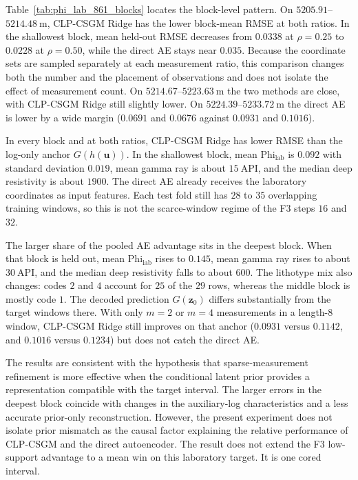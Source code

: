 \begin{table}[htbp]
  \centering
  \caption{Well 861 held-out laboratory-porosity RMSE by depth block. Each
  entry is the mean across the three seeds. Prior-only is $G(h(\boldsymbol{u}))$
  with no measurement term.}
  \label{tab:phi_lab_861_blocks}
  \small
\end{table}

Table~\ref{tab:phi_lab_861_blocks} locates the block-level pattern. On
$5205.91$--$5214.48~\mathrm{m}$, CLP-CSGM Ridge has the lower block-mean RMSE
at both ratios. In the shallowest block, mean held-out RMSE decreases from
$0.0338$ at $\rho=0.25$ to $0.0228$ at $\rho=0.50$, while the direct AE stays
near $0.035$. Because the coordinate sets are sampled separately at each
measurement ratio, this comparison changes both the number and the placement
of observations and does not isolate the effect of measurement count. On
$5214.67$--$5223.63~\mathrm{m}$ the two methods are close, with CLP-CSGM Ridge
still slightly lower. On $5224.39$--$5233.72~\mathrm{m}$ the direct AE is lower
by a wide margin ($0.0691$ and $0.0676$ against $0.0931$ and $0.1016$).

In every block and at both ratios, CLP-CSGM Ridge has lower RMSE than the
log-only anchor $G(h(\boldsymbol{u}))$. In the shallowest block, mean
$\mathrm{Phi_{lab}}$ is $0.092$ with standard deviation $0.019$, mean gamma ray
is about $15~\mathrm{API}$, and the median deep resistivity is about $1900$.
The direct AE already receives the laboratory coordinates as input features.
Each test fold still has $28$ to $35$ overlapping training windows, so this is
not the scarce-window regime of the F3 steps $16$ and $32$.

The larger share of the pooled AE advantage sits in the deepest block. When
that block is held out, mean $\mathrm{Phi_{lab}}$ rises to $0.145$, mean gamma
ray rises to about $30~\mathrm{API}$, and the median deep resistivity falls to
about $600$. The lithotype mix also changes: codes $2$ and $4$ account for
$25$ of the $29$ rows, whereas the middle block is mostly code $1$. The
decoded prediction $G(\boldsymbol{z}_0)$ differs substantially from the target
windows there. With only $m=2$ or $m=4$ measurements in a length-$8$ window,
CLP-CSGM Ridge still improves on that anchor ($0.0931$ versus $0.1142$, and
$0.1016$ versus $0.1234$) but does not catch the direct AE.

The results are consistent with the hypothesis that sparse-measurement
refinement is more effective when the conditional latent prior provides a
representation compatible with the target interval. The larger errors in the
deepest block coincide with changes in the auxiliary-log characteristics and a
less accurate prior-only reconstruction. However, the present experiment does
not isolate prior mismatch as the causal factor explaining the relative
performance of CLP-CSGM and the direct autoencoder. The result does not extend
the F3 low-support advantage to a mean win on this laboratory target. It is
one cored interval.